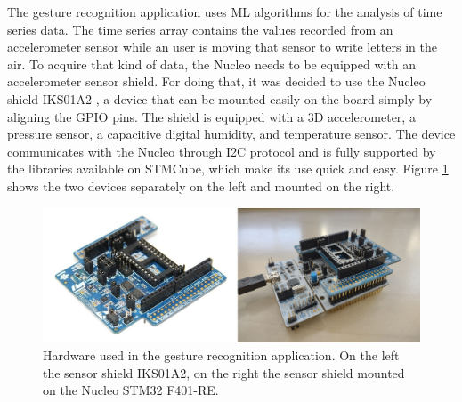 \documentclass[12pt]{report}
\begin{document}
The gesture recognition application uses ML algorithms for the analysis of time series data. The time series array contains the values recorded from an accelerometer sensor while an user is moving that sensor to write letters in the air. To acquire that kind of data, the Nucleo needs to be equipped with an accelerometer sensor shield. For doing that, it was decided to use the Nucleo shield IKS01A2 \cite{shield_web_page}, a device that can be mounted easily on the board simply by aligning the GPIO pins. The shield is equipped with a 3D accelerometer, a pressure sensor, a capacitive digital humidity, and temperature sensor. The device communicates with the Nucleo through I2C protocol and is fully supported by the libraries available on STMCube, which make its use quick and easy. Figure \ref{fig:hardware_stm} shows the two devices separately on the left and mounted on the right.\\

\begin{figure}[h!]
    \centering
    \includegraphics[width=120mm]{Figures/Chapter2/hardware_stm.jpg} 
    \caption{Hardware used in the gesture recognition application. On the left the sensor shield IKS01A2, on the right the sensor shield mounted on the Nucleo STM32 F401-RE.}
    \label{fig:hardware_stm}    
\end{figure}
\end{document}
